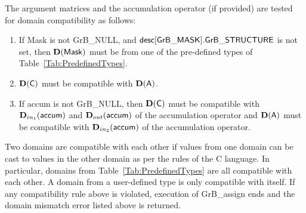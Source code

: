 The argument matrices and the accumulation 
operator (if provided) are tested for domain compatibility as follows:
\begin{enumerate}
	\item If {\sf Mask} is not {\sf GrB\_NULL}, and ${\sf desc[GrB\_MASK].GrB\_STRUCTURE}$
    is not set, then $\bold{D}({\sf Mask})$ must be from one of the pre-defined types of 
    Table~\ref{Tab:PredefinedTypes}.

	\item $\bold{D}({\sf C})$ must be
    compatible with $\bold{D}({\sf A})$.

	\item If {\sf accum} is not {\sf GrB\_NULL}, then $\bold{D}({\sf C})$ must be
    compatible with $\mbox{$\mathbf{D}_{in_{1}}$}({\sf accum})$ and $\mbox{$\mathbf{D}_{out}$}({\sf accum})$ of the accumulation operator and 
    $\bold{D}({\sf A})$ must be compatible with $\mbox{$\mathbf{D}_{in_{2}}$}({\sf accum})$ of the accumulation operator.
\end{enumerate}
Two domains are compatible with each other if values from one domain can be cast 
to values in the other domain as per the rules of the C language.
In particular, domains from Table~\ref{Tab:PredefinedTypes} are all compatible 
with each other. A domain from a user-defined type is only compatible with itself.
If any compatibility rule above is violated, execution of {\sf GrB\_assign} ends
and the domain mismatch error listed above is returned.

